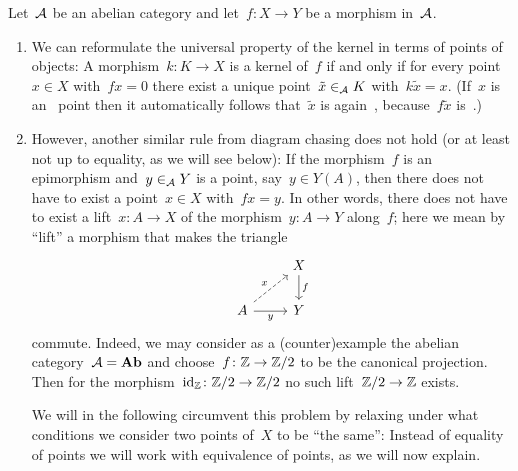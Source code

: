 \begin{remark*}
  \label{motivation for abstract elements}
  Let~$\mathcal{A}$ be an abelian category and let~$f \colon X \to Y$ be a morphism in~$\mathcal{A}$.
  \begin{enumerate}
    \item
      \label{elements of kernel}
      We can reformulate the universal property of the kernel in terms of points of objects:
      A morphism~$k \colon K \to X$ is a kernel of~$f$ if and only if for every point~$x \in X$ with~$fx = 0$ there exist a unique point~$\tilde{x} \in_{\mathcal{A}} K$ with~$k \tilde{x} = x$.
      (If~$x$ is an~ point then it automatically follows that~$\tilde{x}$ is again~, because~$f \tilde{x}$ is~.)
    \item
      However, another similar rule from diagram chasing does not hold (or at least not up to equality, as we will see below):
      If the morphism~$f$ is an epimorphism and~$y \in_{\mathcal{A}} Y$ is a point, say~$y \in Y(A)$, then there does not have to exist a point~$x \in X$ with~$fx = y$.
      In other words, there does not have to exist a lift~$x \colon A \to X$ of the morphism~$y \colon A \to Y$ along~$f$; here we mean by \enquote{lift} a morphism that makes the triangle
      \[
        \begin{tikzcd}
            {}
          & X
            \arrow{d}[right]{f}
          \\
            A
            \arrow[dashed]{ur}[above left]{x}
            \arrow{r}[below]{y}
          & Y
        \end{tikzcd}
      \]
      commute.
      Indeed, we may consider as a (counter)example the abelian category~$\mathcal{A} = \mathbf{Ab}$ and choose~$f \colon \mathbb{Z} \to \mathbb{Z}/2$ to be the canonical projection.
      Then for the morphism~$\operatorname{id}_{\mathbb{Z}} \colon \mathbb{Z}/2 \to \mathbb{Z}/2$ no such lift~$\mathbb{Z}/2 \to \mathbb{Z}$ exists.
      
      We will in the following circumvent this problem by relaxing under what conditions we consider two points of~$X$ to be \enquote{the same}:
      Instead of equality of points we will work with equivalence of points, as we will now explain.
  \end{enumerate}
\end{remark*}


